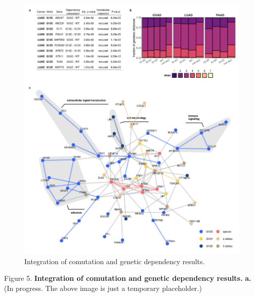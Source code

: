\documentclass[english, 10pt, letterpaper]{article}
\newcommand{\beginsupplement}{%
        \setcounter{table}{0}
        \renewcommand{\thetable}{\arabic{table}}%
        \setcounter{figure}{0}
        \renewcommand{\thefigure}{\arabic{figure}}%
    }
\begin{document}
\begin{figure}[h!]
\centering
\includegraphics[width=180mm]{figures/Fig_5.jpeg}
\caption{Integration of comutation and genetic dependency results.}
\label{fig:results-integration-main}
\end{figure}
\newpage
\noindent Figure 5. \textbf{Integration of comutation and genetic dependency results.}
\textbf{a.} (In progress. The above image is just a temporary placeholder.)
\newpage




\beginsupplement
\makeatletter
\renewcommand{\fnum@figure}{Supplementary \figurename~\thefigure}
\makeatother
\end{document}
